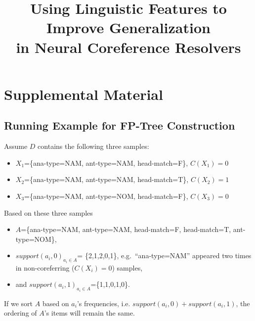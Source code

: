 \documentclass[11pt,a4paper]{article}
\title{Using Linguistic Features to Improve Generalization \\in Neural Coreference Resolvers}
\date{}
\begin{document}
\maketitle

\appendix
\section{Supplemental Material}
\label{sec:supplemental}

\subsection{Running Example for FP-Tree Construction}
Assume $D$ contains the following three samples:
\begin{itemize}
 \item [] $X_1$=\{ana-type=NAM, ant-type=NAM, head-match=F\}, $C(X_1)=0$
 \item[]  $X_2$=\{ana-type=NAM, ant-type=NAM, head-match=T\}, $C(X_2)=1$
 \item[]  $X_3$=\{ana-type=NAM, ant-type=NOM, head-match=F\}, $C(X_3)=0$
\end{itemize}
Based on these three samples
\begin{itemize}
\item $A$=\{ana-type=NAM, ant-type=NAM, head-match=F, head-match=T, ant-type=NOM\},
\item $support(a_i,0)_{a_i \in A}$= \{2,1,2,0,1\}, e.g.\ ``ana-type=NAM'' appeared two times in non-coreferring ($C(X_i)=0$) samples,
\item and $support(a_i,1)_{a_i \in A}$=\{1,1,0,1,0\}.
\end{itemize}
If we sort $A$ based on $a_i$'s frequencies, i.e. $support(a_i,0)+support(a_i,1)$, the ordering of $A$'s items will remain the same.
\end{document}
